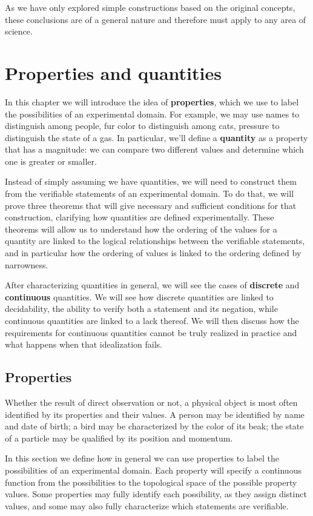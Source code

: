 \documentclass[11pt,letterpaper,fleqn]{memoir} %
\begin{document}
As we have only explored simple constructions based on the original concepts, these conclusions are of a general nature and therefore must apply to any area of science. 

\chapter{Properties and quantities}

In this chapter we will introduce the idea of \textbf{properties}, which we use to label the possibilities of an experimental domain. For example, we may use names to distinguish among people, fur color to distinguish among cats, pressure to distinguish the state of a gas. In particular, we'll define a \textbf{quantity} as a property that has a magnitude: we can compare two different values and determine which one is greater or smaller.

Instead of simply assuming we have quantities, we will need to construct them from the verifiable statements of an experimental domain. To do that, we will prove three theorems that will give necessary and sufficient conditions for that construction, clarifying how quantities are defined experimentally. These theorems will allow us to understand how the ordering of the values for a quantity are linked to the logical relationships between the verifiable statements, and in particular how the ordering of values is linked to the ordering defined by narrowness.

After characterizing quantities in general, we will see the cases of \textbf{discrete} and \textbf{continuous} quantities. We will see how discrete quantities are linked to decidability, the ability to verify both a statement and its negation, while continuous quantities are linked to a lack thereof. We will then discuss how the requirements for continuous quantities cannot be truly realized in practice and what happens when that idealization fails.

\section{Properties}

Whether the result of direct observation or not, a physical object is most often identified by its properties and their values. A person may be identified by name and date of birth; a bird may be characterized by the color of its beak; the state of a particle may be qualified by its position and momentum.

In this section we define how in general we can use properties to label the possibilities of an experimental domain. Each property will specify a continuous function from the possibilities to the topological space of the possible property values. Some properties may fully identify each possibility, as they assign distinct values, and some may also fully characterize which statements are verifiable.
\end{document}
